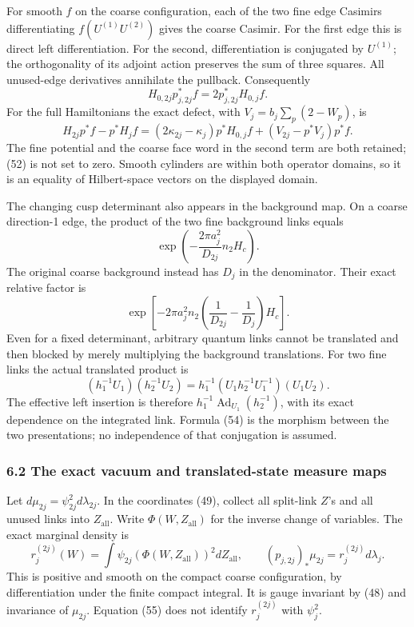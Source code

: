 \documentclass[
  11pt,
]{article}
\begin{document}
For smooth \(f\) on the coarse configuration, each of the two fine edge
Casimirs differentiating \(f(U^{(1)}U^{(2)})\) gives the coarse Casimir.
For the first edge this is direct left differentiation. For the second,
differentiation is conjugated by \(U^{(1)}\); the orthogonality of its
adjoint action preserves the sum of three squares. All unused-edge
derivatives annihilate the pullback. Consequently \[
 H_{0,2j}p_{j,2j}^*f=2p_{j,2j}^*H_{0,j}f.
\tag{51}
\] For the full Hamiltonians the exact defect, with
\(V_j=b_j\sum_p(2-W_p)\), is \[
 H_{2j}p^*f-p^*H_jf
 =(2\kappa_{2j}-\kappa_j)p^*H_{0,j}f
 +(V_{2j}-p^*V_j)p^*f.
\tag{52}
\] The fine potential and the coarse face word in the second term are
both retained; (52) is not set to zero. Smooth cylinders are within both
operator domains, so it is an equality of Hilbert-space vectors on the
displayed domain.

The changing cusp determinant also appears in the background map. On a
coarse direction-1 edge, the product of the two fine background links
equals \[
 \exp\left(-\frac{2\pi a_j^2}{D_{2j}}n_2H_c\right).
\] The original coarse background instead has \(D_j\) in the
denominator. Their exact relative factor is \[
 \exp\left[-2\pi a_j^2n_2
 \left(\frac1{D_{2j}}-\frac1{D_j}\right)H_c\right].
\tag{53}
\] Even for a fixed determinant, arbitrary quantum links cannot be
translated and then blocked by merely multiplying the background
translations. For two fine links the actual translated product is \[
 (h_1^{-1}U_1)(h_2^{-1}U_2)
 =h_1^{-1}(U_1h_2^{-1}U_1^{-1})(U_1U_2).
\tag{54}
\] The effective left insertion is therefore
\(h_1^{-1}\operatorname{Ad}_{U_1}(h_2^{-1})\), with its exact dependence
on the integrated link. Formula (54) is the morphism between the two
presentations; no independence of that conjugation is assumed.

\subsubsection{6.2 The exact vacuum and translated-state measure
maps}\label{the-exact-vacuum-and-translated-state-measure-maps}

Let \(d\mu_{2j}=\psi_{2j}^2d\lambda_{2j}\). In the coordinates (49),
collect all split-link \(Z\)'s and all unused links into
\(Z_{\mathrm{all}}\). Write \(\Phi(W,Z_{\mathrm{all}})\) for the inverse
change of variables. The exact marginal density is \[
 r_j^{(2j)}(W)=\int
 \psi_{2j}(\Phi(W,Z_{\mathrm{all}}))^2dZ_{\mathrm{all}},
 \qquad (p_{j,2j})_*\mu_{2j}=r_j^{(2j)}d\lambda_j.
\tag{55}
\] This is positive and smooth on the compact coarse configuration, by
differentiation under the finite compact integral. It is gauge invariant
by (48) and invariance of \(\mu_{2j}\). Equation (55) does not identify
\(r_j^{(2j)}\) with \(\psi_j^2\).
\end{document}
